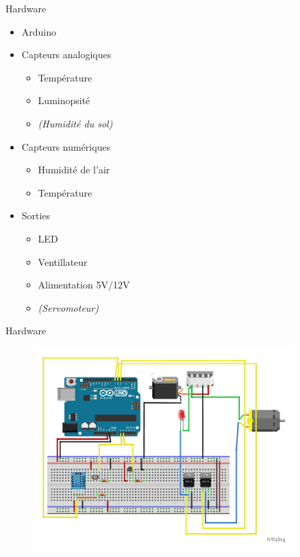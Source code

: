 \documentclass{beamer}
\begin{document}
        \begin{frame}{Hardware}
            \begin{itemize}
                \item Arduino
                \item Capteurs analogiques
                    \begin{itemize}
                        \item Température
                        \item Luminopsité
                        \item \textit{(Humidité du sol)}
                    \end{itemize}
                \item Capteurs numériques
                    \begin{itemize}
                        \item Humidité de l'air
                        \item Température
                    \end{itemize}
                \item Sorties
                    \begin{itemize}
                        \item LED
                        \item Ventillateur
                        \item Alimentation 5V/12V
                        \item \textit{(Servomoteur)}
                    \end{itemize}
            \end{itemize}
        \end{frame}

		\begin{frame}{Hardware}
			\begin{figure}
                \centering
                \includegraphics[width = 0.9\textwidth]{hardware.pdf}
            \end{figure}
		\end{frame}
\end{document}
